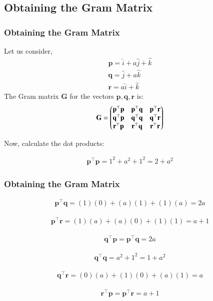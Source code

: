 \documentclass{beamer}
\theoremstyle{remark}
\let\vec\mathbf
\numberwithin{equation}{section}
\begin{document}
\subsection{Obtaining the Gram Matrix}
\begin{frame}
\frametitle{Obtaining the Gram Matrix}
Let us consider,
\begin{align*}
\vec{p}=\hat{i}+a\hat{j}+\hat{k}\\
\vec{q}=\hat{j}+a\hat{k}\\
\vec{r}=a\hat{i}+\hat{k}
\end{align*}
The Gram matrix $\vec{G} $ for the vectors $ \vec{p}, \vec{q}, \vec{r} $ is:
\begin{align}
\vec{G} = \myvec{
\vec{p}^\top \vec{p} & \vec{p}^\top \vec{q} & \vec{p}^\top \vec{r} \\
\vec{q}^\top \vec{p} & \vec{q}^\top \vec{q} & \vec{q}^\top \vec{r} \\
\vec{r}^\top \vec{p} & \vec{r}^\top \vec{q} & \vec{r}^\top \vec{r}
}
\end{align}

Now, calculate the dot products:

\begin{align}
\vec{p}^\top \vec{p} = 1^2 + a^2 + 1^2 = 2+a^2
\end{align}
\end{frame}
\begin{frame}
\frametitle{Obtaining the Gram Matrix}
\begin{align}
\vec{p}^\top \vec{q} = (1)(0) + (a)(1) + (1)(a) = 2a
\end{align}

\begin{align}
\vec{p}^\top \vec{r} = (1)(a) + (a)(0) + (1)(1) = a+1
\end{align}

\begin{align}
\vec{q}^\top \vec{p} = \vec{p}^\top \vec{q} = 2a
\end{align}

\begin{align}
\vec{q}^\top \vec{q} = a^2 + 1^2 = 1 + a^2
\end{align}

\begin{align}
\vec{q}^\top \vec{r} = (0)(a) + (1)(0) + (a)(1) = a
\end{align}

\begin{align}
\vec{r}^\top \vec{p} = \vec{p}^\top \vec{r} = a + 1
\end{align}

 \end{frame}
\end{document}
